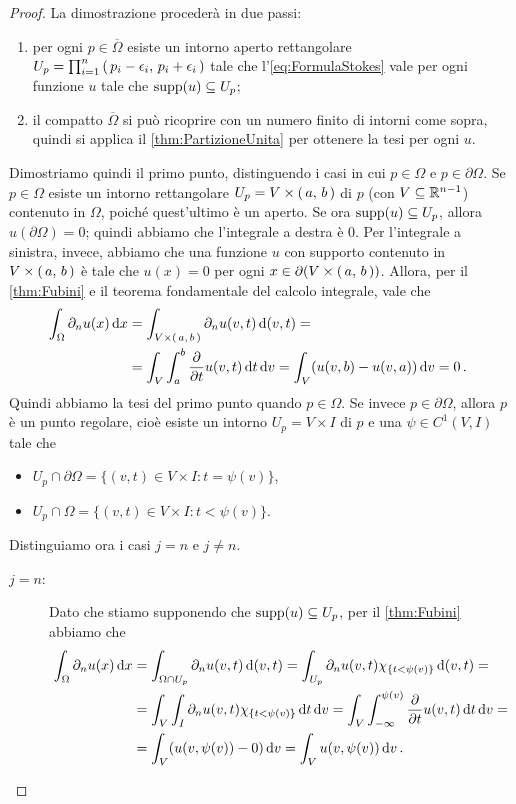 \begin{proof}
	La dimostrazione procederà in due passi:
	\begin{enumerate}
		\item per ogni $p\in \overline\Omega$ esiste un intorno aperto rettangolare $U_p=\prod_{i=1}^n \left(\,p_i-\epsilon_i,\,p_i+\epsilon_i\,\right)$
			tale che l'\cref{eq:FormulaStokes} vale per ogni funzione $u$ tale che $\operatorname{supp}(u)\subseteq U_p$;
		\item il compatto $\overline\Omega$ si può ricoprire con un numero finito di intorni come sopra, quindi si applica il \cref{thm:PartizioneUnita} per ottenere
			la tesi per ogni $u$.
	\end{enumerate}
	
	Dimostriamo quindi il primo punto, distinguendo i casi in cui $p\in \Omega$ e $p\in \partial \Omega$.
	Se $p\in \Omega$ esiste un intorno rettangolare $U_p=V\times \left(\,a,\,b\,\right)$ di $p$ (con $V\subseteq \mathbb R^{n-1}$) contenuto in $\Omega$, poiché quest'ultimo è un aperto. Se ora $\operatorname{supp}(u)\subseteq U_p$,
	allora $u(\partial \Omega)=0$; quindi abbiamo che l'integrale a destra è $0$. Per l'integrale a sinistra, invece, abbiamo che una funzione $u$
	con supporto contenuto in $V\times \left(\,a,\,b\,\right)$ è tale che $u(x)=0$ per ogni
	$x\in \partial (V\times \left(\,a,\,b\,\right))$. Allora, per il \cref{thm:Fubini} e il teorema fondamentale del calcolo integrale, vale che
	\begin{align*}
		\int_{\Omega} \partial_n u(x) \,\mathrm d x &= \int_{V\times \left(\,a,\,b\,\right)} \partial_n u(v,t) \,\mathrm d (v,t) = \\
		& = \int_V \int_a^b \frac{\partial}{\partial t} u(v,t) \,\mathrm d t \,\mathrm d v = \int_V (u(v,b) - u(v,a)) \,\mathrm d v = 0\, \text{. }
	\end{align*}
	Quindi abbiamo la tesi del primo punto quando $p\in\Omega$. Se invece $p\in \partial \Omega$, allora $p$ è un punto regolare, cioè esiste
	un intorno $U_p=V\times I$ di $p$ e una $\psi\in C^1(V,I)$ tale che
	\begin{itemize}
		\item $U_p\cap \partial \Omega = \{(v,t)\in V\times I:t=\psi(v)\}$,
		\item $U_p\cap \Omega = \{(v,t)\in V\times I:t<\psi(v)\}$.
	\end{itemize}
	Distinguiamo ora i casi $j=n$ e $j\neq n$.
	\begin{description}
		\item [$j=n$:] Dato che stiamo supponendo che $\operatorname{supp}(u)\subseteq U_p$, per il \cref{thm:Fubini} abbiamo che
			\begin{align*}
				\int_{\Omega} \partial_n u(x) \,\mathrm d x  &= \int_{\Omega\cap U_p} \partial_n u(v,t)\,\mathrm d (v,t) =
				\int_{U_p} \partial_n u(v,t) \chi_{\{t<\psi(v)\}} \,\mathrm d (v,t) = \\
				& = \int_V \int_I \partial_n u(v,t) \chi_{\{t<\psi(v)\}} \,\mathrm d t \,\mathrm d v =
				\int_V \int_{-\infty}^{\psi(v)} \frac{\partial}{\partial t} u(v,t) \,\mathrm d t \,\mathrm d v = \\
				& = \int_V (u(v,\psi(v)) - 0) \,\mathrm d v = \int_V u(v,\psi(v)) \,\mathrm d v\, \text{. }
			\end{align*}
			

\end{description}
\end{proof}
